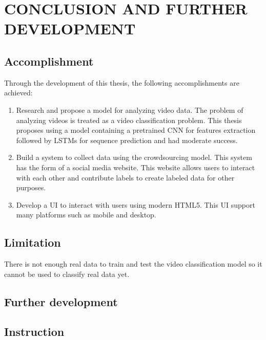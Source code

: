 \chapter{CONCLUSION AND FURTHER DEVELOPMENT}

\section{Accomplishment}
Through the development of this thesis, the following accomplishments are achieved:
\begin{enumerate}
    \item Research and propose a model for analyzing video data. The problem of analyzing videos is treated as a video classification problem. This thesis proposes using a model containing a pretrained CNN for features extraction followed by LSTMs for sequence prediction and had moderate success.
    \item Build a system to collect data using the crowdsourcing model. This system has the form of a social media website. This website allows users to interact with each other and contribute labels to create labeled data for other purposes.
    \item Develop a UI to interact with users using modern HTML5. This UI support many platforms such as mobile and desktop.
\end{enumerate}


\section{Limitation}
There is not enough real data to train and test the video classification model so it cannot be used to classify real data yet.
\section{Further development}
\section{Instruction}
